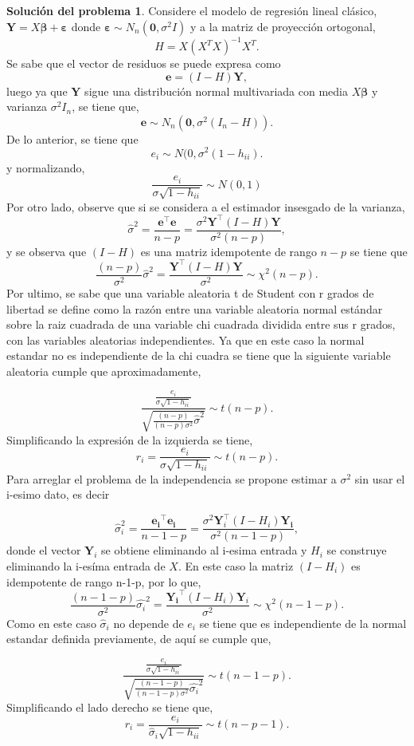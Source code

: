 \documentclass[twoside,12pt]{article}
\theoremstyle{definition}
\newtheorem{soln}{Solución del problema}
\begin{document}
\newpage
\begin{soln}
 Considere el modelo de regresión lineal clásico, $\boldsymbol{Y}=X\boldsymbol{\beta} + \boldsymbol{\varepsilon}$ donde $\boldsymbol{\varepsilon}\sim N_n(\boldsymbol{0},\sigma^2I)$ y a la matriz de proyección ortogonal,
    $$
    H=X(X^TX)^{-1}X^T.
    $$
 Se sabe que el vector de residuos se puede expresa como 
 $$
 \boldsymbol{e}=(I-H)\boldsymbol{Y},
 $$
luego ya que $\boldsymbol{Y}$ sigue una distribución normal multivariada con media $X\boldsymbol{\beta}$ y varianza $\sigma^2 I_n$, se tiene que, 
$$
\boldsymbol{e}\sim N_n\left(\mathbf{0}, \sigma^2\left(I_n-H\right)\right).
$$
De lo anterior, se tiene que 
$$
e_i \sim N(0,\sigma^2 (1-h_{ii}).
$$
y normalizando,
$$
\frac{e_i}{\sigma\sqrt{1-h_{ii}}}\sim N(0,1)
$$
Por otro lado, observe que si se considera a el estimador insesgado de la varianza,
$$\hat{\sigma}^2=\frac{\mathbf{e}^{\top} \mathbf{e}}{n-p}=\frac{\sigma^2 \mathbf{Y}^{\top}(I-H) \mathbf{Y}}{\sigma^2 (n-p)},$$
y se observa que $(I-H)$ es una matriz idempotente de rango $n-p$ se tiene que 
$$
\frac{(n-p)}{\sigma^2}\hat{\sigma}^2= \frac{ \mathbf{Y}^{\top}(I-H) \mathbf{Y}}{\sigma^2} \sim \chi^2(n-p).
$$
Por ultimo, se sabe que una variable aleatoria t de Student con r grados de libertad se define como la razón entre una variable aleatoria normal estándar sobre la raiz cuadrada de una variable chi cuadrada dividida entre sus r grados, con las variables aleatorias independientes. Ya que en este caso la normal estandar no es independiente de la chi cuadra se tiene que la siguiente variable aleatoria cumple que aproximadamente,

$$
\frac{\frac{e_i}{\sigma\sqrt{1-h_{ii}}}}{\sqrt{\frac{(n-p)}{(n-p)\sigma^2}\hat{\sigma}^2}} \sim t(n-p).
$$
Simplificando la expresión de la izquierda se tiene, 
$$
r_i=\frac{e_i}{\hat{\sigma} \sqrt{1-h_{i i}}} \sim t(n-p).
$$
Para arreglar el problema de la independencia se propone estimar a $\sigma^2$ sin usar el i-esimo dato, es decir

$$
\hat{\sigma}_{i}^2=\frac{\mathbf{e_i}^{\top} \mathbf{e_i}}{n-1-p}=\frac{\sigma^2 \mathbf{Y}_i^{\top}(I-H_i) \mathbf{Y_i}}{\sigma^2 (n-1-p)},
$$
donde el vector $\mathbf{Y}_i$ se obtiene eliminando al i-esima entrada y $H_i$ se construye eliminando la i-esíma entrada de $X.$ En este caso la matriz $(I-H_i)$ es idempotente de rango n-1-p, por lo que, 
$$
\frac{(n-1-p)}{\sigma^2}\hat{\sigma_i}^2= \frac{ \mathbf{Y_i}^{\top}(I-H_i) \mathbf{Y}_i}{\sigma^2} \sim \chi^2(n-1-p).
$$
Como en este caso $\hat{\sigma}_i$ no depende de $e_i$ se tiene que es independiente de la normal estandar definida previamente, de aquí se cumple que, 

$$
\frac{\frac{e_i}{\sigma\sqrt{1-h_{ii}}}}{\sqrt{\frac{(n-1-p)}{(n-1-p)\sigma^2}\hat{\sigma_i}^2}} \sim t(n-1-p).
$$
Simplificando el lado derecho se tiene que,
$$
r_i=\frac{e_i}{\hat{\sigma}_i \sqrt{1-h_{i i}}}\sim t(n-p-1).
$$
\end{soln}
\end{document}
